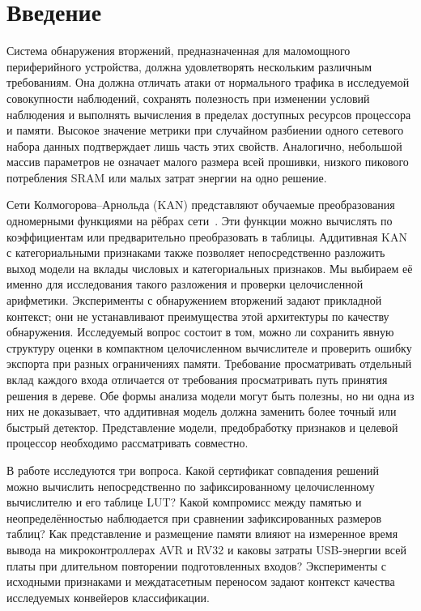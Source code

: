 \section{Введение}
Система обнаружения вторжений, предназначенная для маломощного периферийного устройства, должна удовлетворять нескольким различным требованиям. Она должна отличать атаки от нормального трафика в исследуемой совокупности наблюдений, сохранять полезность при изменении условий наблюдения и выполнять вычисления в пределах доступных ресурсов процессора и памяти. Высокое значение метрики при случайном разбиении одного сетевого набора данных подтверждает лишь часть этих свойств. Аналогично, небольшой массив параметров не означает малого размера всей прошивки, низкого пикового потребления SRAM или малых затрат энергии на одно решение.

Сети Колмогорова--Арнольда (KAN) представляют обучаемые преобразования одномерными функциями на рёбрах сети~\cite{liu2024kan}. Эти функции можно вычислять по коэффициентам или предварительно преобразовать в таблицы. Аддитивная KAN с категориальными признаками также позволяет непосредственно разложить выход модели на вклады числовых и категориальных признаков. Мы выбираем её именно для исследования такого разложения и проверки целочисленной арифметики. Эксперименты с обнаружением вторжений задают прикладной контекст; они не устанавливают преимущества этой архитектуры по качеству обнаружения. Исследуемый вопрос состоит в том, можно ли сохранить явную структуру оценки в компактном целочисленном вычислителе и проверить ошибку экспорта при разных ограничениях памяти. Требование просматривать отдельный вклад каждого входа отличается от требования просматривать путь принятия решения в дереве. Обе формы анализа модели могут быть полезны, но ни одна из них не доказывает, что аддитивная модель должна заменить более точный или быстрый детектор. Представление модели, предобработку признаков и целевой процессор необходимо рассматривать совместно.

В работе исследуются три вопроса. Какой сертификат совпадения решений можно вычислить непосредственно по зафиксированному целочисленному вычислителю и его таблице LUT? Какой компромисс между памятью и неопределённостью наблюдается при сравнении зафиксированных размеров таблиц? Как представление и размещение памяти влияют на измеренное время вывода на микроконтроллерах AVR и RV32 и каковы затраты USB-энергии всей платы при длительном повторении подготовленных входов? Эксперименты с исходными признаками и междатасетным переносом задают контекст качества исследуемых конвейеров классификации.

